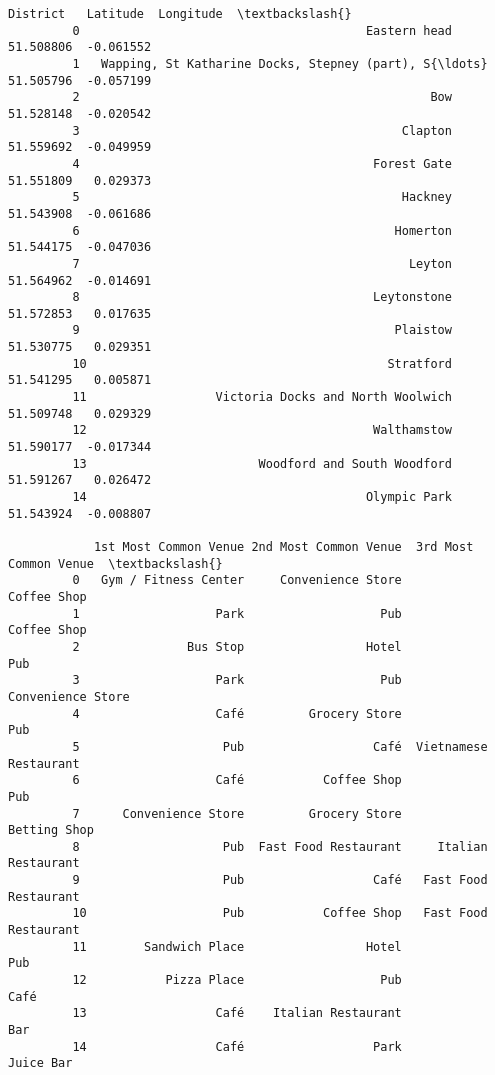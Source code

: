 \documentclass[11pt]{article}
\begin{document}
\begin{Verbatim}[commandchars=\\\{\}]
                                                      District   Latitude  Longitude  \textbackslash{}
         0                                        Eastern head  51.508806  -0.061552   
         1   Wapping, St Katharine Docks, Stepney (part), S{\ldots}  51.505796  -0.057199   
         2                                                 Bow  51.528148  -0.020542   
         3                                             Clapton  51.559692  -0.049959   
         4                                         Forest Gate  51.551809   0.029373   
         5                                             Hackney  51.543908  -0.061686   
         6                                            Homerton  51.544175  -0.047036   
         7                                              Leyton  51.564962  -0.014691   
         8                                         Leytonstone  51.572853   0.017635   
         9                                            Plaistow  51.530775   0.029351   
         10                                          Stratford  51.541295   0.005871   
         11                  Victoria Docks and North Woolwich  51.509748   0.029329   
         12                                        Walthamstow  51.590177  -0.017344   
         13                        Woodford and South Woodford  51.591267   0.026472   
         14                                       Olympic Park  51.543924  -0.008807   
         
            1st Most Common Venue 2nd Most Common Venue  3rd Most Common Venue  \textbackslash{}
         0   Gym / Fitness Center     Convenience Store            Coffee Shop   
         1                   Park                   Pub            Coffee Shop   
         2               Bus Stop                 Hotel                    Pub   
         3                   Park                   Pub      Convenience Store   
         4                   Café         Grocery Store                    Pub   
         5                    Pub                  Café  Vietnamese Restaurant   
         6                   Café           Coffee Shop                    Pub   
         7      Convenience Store         Grocery Store           Betting Shop   
         8                    Pub  Fast Food Restaurant     Italian Restaurant   
         9                    Pub                  Café   Fast Food Restaurant   
         10                   Pub           Coffee Shop   Fast Food Restaurant   
         11        Sandwich Place                 Hotel                    Pub   
         12           Pizza Place                   Pub                   Café   
         13                  Café    Italian Restaurant                    Bar   
         14                  Café                  Park              Juice Bar   
         

\end{Verbatim}
\end{document}
